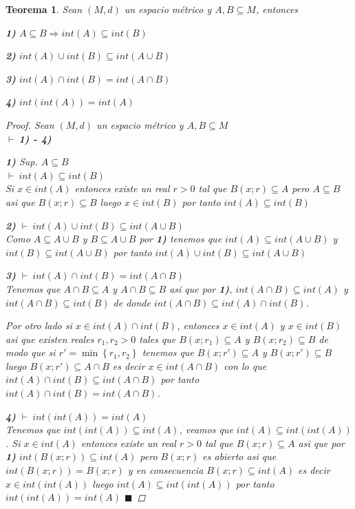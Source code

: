 \documentclass[oneside]{book} %
\theoremstyle{Teorema}
\newtheorem{Teorema}[Definicion]{Teorema}
\theoremstyle{Ejemplos}
\theoremstyle{[Obs]}
\renewcommand{\{}{\left\lbrace} %
\renewcommand{\}}{\right\rbrace} %
\renewcommand{\u}{\cup} %
\newcommand{\n}{\cap} %
\renewcommand{\sc}{\subseteq} %
\renewcommand{\qed}{$\blacksquare$} %
\newcommand{\pd}{$\vdash\ $} %
\begin{document}
			\begin{Teorema}\setlength{\parindent}{0em}
			
				Sean $(M, d)$ un espacio métrico y $A, B \sc M$, entonces 

				\textbf{1)} $A \sc B \Rightarrow int(A) \sc int(B)$
				
				\textbf{2)} $int(A) \u int(B) \sc int(A \u B)$

				\textbf{3)} $int(A) \n int(B) = int(A \n B)$

				\textbf{4)} $int(int(A)) = int(A)$
			
				\begin{proof}
					
					Sean $(M, d)$ un espacio métrico y $A, B \sc M$ \\ 
					\pd \textbf{1) - 4)}

					\textbf{1)} Sup. $A \sc B$ \\ 
					\pd $int(A) \sc int(B)$ \\ 
					Si $x \in int(A)$ entonces existe un real $r > 0$ tal que $B(x;r) \sc A$ pero $A \sc B$ asi que $B(x;r) \sc B$ luego $x \in int(B)$ por tanto $int(A) \sc int(B)$
					
					\textbf{2)} \pd $int(A) \u int(B) \sc int(A \u B)$ \\ 
					Como $A \sc A \u B$ y $B \sc A \u B$ por \textbf{1)} tenemos que $int(A) \sc int(A \u B)$ y $int(B) \sc int(A \u B)$ por tanto $int(A) \u int(B) \sc int(A \u B)$ 

					\textbf{3)} \pd $int(A) \n int(B) = int(A \n B)$ \\ 
					Tenemos que $A \n B \sc A$ y $A \n B \sc B$ asi que por \textbf{1)}, $int(A \n B) \sc int(A)$ y $int(A \n B) \sc int(B)$ de donde $int(A \n B) \sc int(A) \n int(B)$. 
					
					Por otro lado si $x \in int(A) \n int(B)$, entonces $x \in int(A)$ y $x \in int(B)$ asi que existen reales $r_1, r_2 > 0$ tales que $B(x;r_1) \sc A$ y $B(x;r_2) \sc B$ de modo que si $r' = \min\{ r_1, r_2 \}$ tenemos que $B(x;r') \sc A$ y $B(x;r') \sc B$ luego $B(x;r') \sc A \n B$ es decir $x \in int(A \n B)$ con lo que $int(A) \n int(B) \sc int(A \n B)$ por tanto $int(A) \n int(B) = int(A \n B)$.

					\textbf{4)} \pd $int(int(A)) = int(A)$ \\
					Tenemos que $int(int(A)) \sc int(A)$, veamos que $int(A) \sc int(int(A))$. Si $x \in int(A)$ entonces existe un real $r > 0$ tal que $B(x;r) \sc A$ asi que por \textbf{1)} $int(B(x;r)) \sc int(A)$ pero $B(x;r)$ es abierto asi que $int(B(x;r)) = B(x;r)$ y en consecuencia $B(x;r) \sc int(A)$ es decir $x \in int(int(A))$ luego $int(A) \sc int(int(A))$ por tanto $int(int(A)) = int(A)$ \qed

				\end{proof}

			\end{Teorema}
\end{document}

